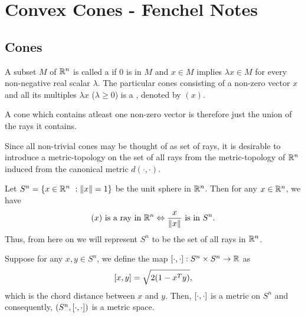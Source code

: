 \documentclass[11pt,a4paper]{article}
\begin{document}
\section*{Convex Cones - Fenchel Notes}

\subsection*{Cones}


\begin{definition}
    A subset $M$ of $\mathbb{R}^n$ is called a  if $0$ is in $M$ and $x\in M$ implies $\lambda x\in M$ for every non-negative real scalar $\lambda$. The particular cones consisting of a non-zero vector $x$ and all its multiples $\lambda x$ ($\lambda \ge 0$) is a , denoted by $(x)$. 
\end{definition}

\begin{remark}
    A cone which contains atleast one non-zero vector is therefore just the union of the rays it contains.
\end{remark}

Since all non-trivial cones may be thought of as set of rays, it is desirable to introduce a metric-topology on the set of all rays from the metric-topology of $\mathbb{R}^n$ induced from the canonical metric $d(\cdot,\cdot)$.

\begin{remark}
    Let $S^n = \{x\in \mathbb{R}^n\ : \|x\| = 1\}$ be the unit sphere in $\mathbb{R}^n$. Then for any $x\in \mathbb{R}^n$, we have
    \begin{equation*}
        (x) \text{ is a ray in } \mathbb{R}^n \Leftrightarrow \frac{x}{\|x\|} \text{ is in } S^n.
    \end{equation*}
    Thus, from here on we will represent $S^n$ to be the set of all rays in $\mathbb{R}^n$.
\end{remark}


\begin{proposition}
    Suppose for any $x,y\in S^n$, we define the map $[\cdot, \cdot]:S^n\times S^n\rightarrow \mathbb{R}$ as
    \begin{equation*}
        [x, y] = \sqrt{2(1 - x^Ty)},
    \end{equation*}
    which is the chord distance between $x$ and $y$. Then, $[\cdot, \cdot]$ is a metric on $S^n$ and consequently, $(S^n, [\cdot, \cdot])$ is a metric space.
\end{proposition}
\end{document}
